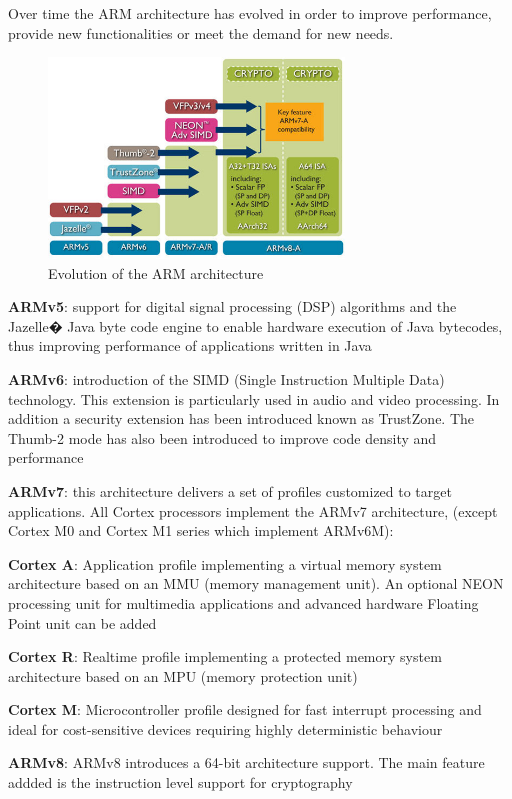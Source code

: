 \documentclass[pdftex,10pt,a4paper]{report}
\newenvironment{packed_item}{
\begin{itemize}
  \setlength{\itemsep}{1pt}
  \setlength{\parskip}{0pt}
  \setlength{\parsep}{0pt}
}{\end{itemize}}
\begin{document}
Over time the ARM architecture has evolved in order to improve performance, provide new functionalities or meet the demand for new needs.
\begin{figure}[h!]
\centering
\includegraphics[width=0.7\textwidth]{./arm_arch.jpg}
\caption{Evolution of the ARM architecture}
\label{Evolution of the ARM architecture}
\end{figure}

\begin{packed_item}
	\item \textbf{ARMv5}: support for digital signal processing (DSP) algorithms and the Jazelle� Java byte code engine to enable hardware execution of Java bytecodes, thus improving performance of applications written in Java
	\item \textbf{ARMv6}: introduction of the SIMD (Single Instruction Multiple Data) technology. This extension is particularly used in audio and video processing. In addition a security extension has been introduced known as TrustZone. The Thumb-2 mode has also been introduced to improve code density and performance
	\item \textbf{ARMv7}: this architecture delivers a set of profiles customized to target applications. All Cortex processors implement the ARMv7 architecture, (except Cortex M0 and Cortex M1 series which implement ARMv6M):
	\begin{packed_item}
		\item \textbf{Cortex A}: Application profile implementing a virtual memory system architecture based on an MMU (memory management unit). An optional NEON processing unit for multimedia applications and advanced hardware Floating Point unit can be added
		\item \textbf{Cortex R}: Realtime profile implementing a protected memory system architecture based on an MPU (memory protection unit)
		\item \textbf{Cortex M}: Microcontroller profile designed for fast interrupt processing and ideal for cost-sensitive devices requiring highly deterministic behaviour
	\end{packed_item}
	\item \textbf{ARMv8}: ARMv8 introduces a 64-bit architecture support. The main feature addded is the instruction level support for cryptography
\end{packed_item}
\end{document}
